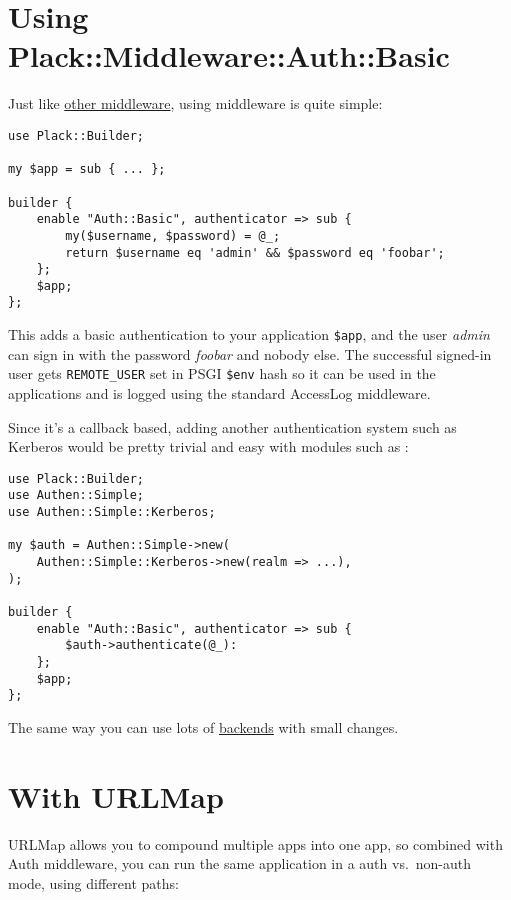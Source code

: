 \section{Using
Plack::Middleware::Auth::Basic}\label{using-plackmiddlewareauthbasic}

Just like
\href{http://advent.plackperl.org/2009/12/day-10-using-plack-middleware.html}{other
middleware}, using  middleware is quite simple:

\begin{lstlisting}
use Plack::Builder;

my $app = sub { ... };

builder {
    enable "Auth::Basic", authenticator => sub {
        my($username, $password) = @_;
        return $username eq 'admin' && $password eq 'foobar';
    };
    $app;
};
\end{lstlisting}

This adds a basic authentication to your application \lstinline!$app!,
and the user \emph{admin} can sign in with the password \emph{foobar}
and nobody else. The successful signed-in user gets
\lstinline!REMOTE_USER! set in PSGI \lstinline!$env! hash so it can be
used in the applications and is logged using the standard AccessLog
middleware.

Since it's a callback based, adding another authentication system such
as Kerberos would be pretty trivial and easy with modules such as
:

\begin{lstlisting}
use Plack::Builder;
use Authen::Simple;
use Authen::Simple::Kerberos;

my $auth = Authen::Simple->new(
    Authen::Simple::Kerberos->new(realm => ...),
);

builder {
    enable "Auth::Basic", authenticator => sub {
        $auth->authenticate(@_):
    };
    $app;
};
\end{lstlisting}

The same way you can use lots of
\href{http://search.cpan.org/search?query=authen+simple\&mode=all}{
backends} with small changes.

\section{With URLMap}\label{with-urlmap}

URLMap allows you to compound multiple apps into one app, so combined
with Auth middleware, you can run the same application in a auth
vs.~non-auth mode, using different paths:

